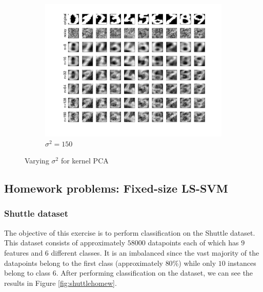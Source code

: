 \documentclass[a4paper, 11pt, one column]{article}
\begin{document}
\begin{figure}[H]
\begin{subfigure}{0.33\textwidth}
            \includegraphics[width=\linewidth]{images/very_high_sigma_150.png}
            \caption{$\sigma^2 = 150$}
        \end{subfigure}
        \caption{Varying $\sigma^2$ for kernel PCA}
        \label{fig:pcasigmahome}
\end{figure}


\subsection{Homework problems: Fixed-size LS-SVM}
\subsubsection{Shuttle dataset}
The objective of this exercise is to perform classification on the Shuttle dataset. This dataset consists of approximately $58000$ datapoints each of which has $9$ features and $6$ different classes. It is an imbalanced since the vast majority of the datapoints belong to the first class (approximately $80\%$) while only $10$ instances belong to class $6$. After performing classification on the dataset, we can see the results in Figure \ref{fig:shuttlehomew}. 
\end{document}
